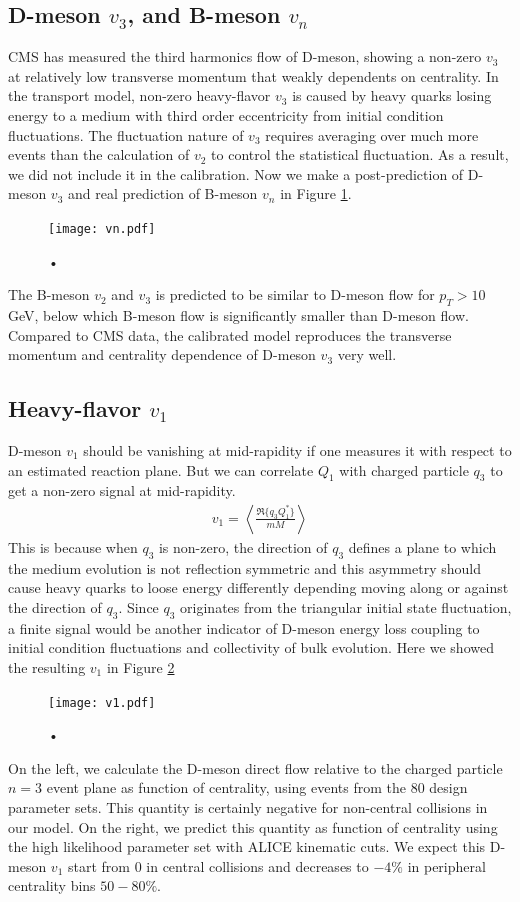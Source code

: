 \documentclass[aps, prc, reprint, amsmath, groupedaddress, nofootinbib]{revtex4-1}
\begin{document}
\subsection{D-meson $v_3$, and B-meson $v_n$}
CMS has measured the third harmonics flow of D-meson, showing a non-zero $v_3$ at relatively low transverse momentum that weakly dependents on centrality.
In the transport model, non-zero heavy-flavor $v_3$ is caused by heavy quarks losing energy to a medium with third order eccentricity from initial condition fluctuations.
The fluctuation nature of $v_3$ requires averaging over much more events than the calculation of $v_2$ to control the statistical fluctuation.
As a result, we did not include it in the calibration.
Now we make a post-prediction of D-meson $v_3$ and real prediction of B-meson $v_n$ in Figure \ref{plots:pred:vn}.
\begin{figure}
\texttt{[image: vn.pdf]}
\caption{•}\label{plots:pred:vn}
\end{figure}
The B-meson $v_2$ and $v_3$ is predicted to be similar to D-meson flow for $p_T > 10$ GeV, below which B-meson flow is significantly smaller than D-meson flow.
Compared to CMS data, the calibrated model reproduces the transverse momentum and centrality dependence of D-meson $v_3$ very well.
\subsection{Heavy-flavor $v_1$}
D-meson $v_1$ should be vanishing at mid-rapidity if one measures it with respect to an estimated reaction plane.
But we can correlate $Q_1$ with charged particle $q_3$ to get a non-zero signal at mid-rapidity.
\begin{eqnarray}
v_1 = \left\langle \frac{\Re\{q_3 Q_1^*\}}{mM} \right\rangle
\end{eqnarray}
This is because when $q_3$ is non-zero, the direction of $q_3$ defines a plane to which the medium evolution is not reflection symmetric and this asymmetry should cause heavy quarks to loose energy differently depending moving along or against the direction of $q_3$.
Since $q_3$ originates from the triangular initial state fluctuation, a finite signal would be another indicator of D-meson energy loss coupling to initial condition fluctuations and collectivity of bulk evolution.
Here we showed the resulting $v_1$ in Figure \ref{plots:pred:v1}
\begin{figure}
\texttt{[image: v1.pdf]}
\caption{•}\label{plots:pred:v1}
\end{figure}
On the left, we calculate the D-meson direct flow relative to the charged particle $n=3$ event plane as function of centrality, using events from the 80 design parameter sets.
This quantity is certainly negative for non-central collisions in our model.
On the right, we predict this quantity as function of centrality using the high likelihood parameter set with ALICE kinematic cuts.
We expect this D-meson $v_1$ start from 0 in central collisions and decreases to $-4\%$ in peripheral centrality bins $50-80\%$.
\end{document}
